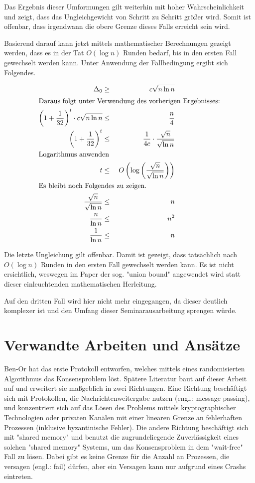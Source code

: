 \documentclass[12pt,ngerman,a4paper]{scrartcl}
\theoremstyle{plain}
\theoremstyle{definition}
\theoremstyle{remark}
\begin{document}
Das Ergebnis dieser Umformungen gilt weiterhin mit hoher Wahrscheinlichkeit
und zeigt, dass das Ungleichgewicht von Schritt zu Schritt größer wird. Somit
ist offenbar, dass irgendwann die obere Grenze dieses Falls erreicht sein wird.

Basierend darauf kann jetzt mittels mathematischer Berechnungen gezeigt werden,
dass es in der Tat $O(\log n)$ Runden bedarf, bis in den ersten Fall gewechselt
werden kann. Unter Anwendung der Fallbedingung ergibt sich Folgendes.

\begin{alignat*}{2}
    \Delta_0 &\geq& c\sqrt{n \ln n} \\
    \intertext{Daraus folgt unter Verwendung des vorherigen Ergebnisses:}
    \left(1 + \frac{1}{32} \right)^{t} \cdot c\sqrt{n \ln n} &\leq& \frac{n}{4} \\
    \left(1 + \frac{1}{32} \right)^{t} &\leq& \frac{1}{4c} \cdot \frac{\sqrt{n}}{\sqrt{\ln n}} \\
    \intertext{Logarithmus anwenden}
    t &\leq& \; O\left(\log \left( \frac{\sqrt{n}}{\sqrt{\ln n}} \right) \right) \\
    \intertext{Es bleibt noch Folgendes zu zeigen.}
    \frac{\sqrt{n}}{\sqrt{\ln n}} &\leq& n \\
    \frac{n}{\ln n} &\leq& n^2 \\
    \frac{1}{\ln n} &\leq& n
\end{alignat*}

Die letzte Ungleichung gilt offenbar. Damit ist gezeigt, dass tatsächlich nach
$O(\log n)$ Runden in den ersten Fall gewechselt werden kann. Es ist nicht
ersichtlich, weswegen im Paper der sog. "union bound" angewendet wird statt dieser
einleuchtenden mathematischen Herleitung.

Auf den dritten Fall wird hier nicht mehr eingegangen, da dieser deutlich komplexer
ist und den Umfang dieser Seminarausarbeitung sprengen würde.

\section{Verwandte Arbeiten und Ansätze}

Ben-Or\cite{Ben-Or1983} hat das erste Protokoll
entworfen, welches mittels eines randomisierten Algorithmus das Konsensproblem
löst. Spätere Literatur baut auf dieser Arbeit auf und erweitert sie maßgeblich
in zwei Richtungen. Eine Richtung beschäftigt sich mit Protokollen, die
Nachrichtenweitergabe nutzen (engl.: message passing), und konzentriert sich auf
das Lösen des Problems mittels kryptographischer Technologien oder privaten Kanälen
mit einer linearen Grenze an fehlerhaften Prozessen (inklusive byzantinische Fehler).
Die andere Richtung beschäftigt sich mit "shared memory"
und benutzt die zugrundeliegende Zuverlässigkeit eines solchen "shared memory"
Systems, um das Konsensproblem in dem "wait-free" Fall zu lösen.
Dabei gibt es keine Grenze für die Anzahl an Prozessen, die versagen (engl.: fail)
dürfen, aber ein Versagen kann nur aufgrund eines Crashs eintreten.
\end{document}
